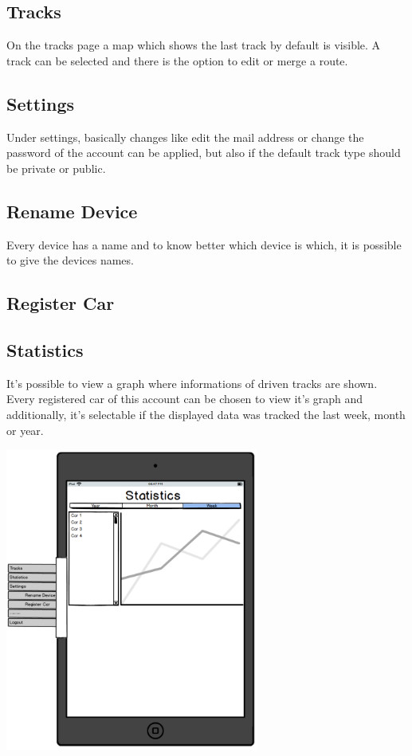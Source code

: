 \subsection{Tracks}
On the tracks page a map which shows the last track by default is visible. A track can be selected and there is the option to edit or merge a route.
\subsection{Settings}
Under settings, basically changes like edit the mail address or change the password of the account can be applied, but also if the default track type should be private or public.
\subsection{Rename Device}
Every device has a name and to know better which device is which, it is possible to give the devices names.
\subsection{Register Car}

\subsection{Statistics}
It’s possible to view a graph where informations of driven tracks are shown. Every registered car of this account can be chosen to view it’s graph and additionally, it’s selectable if the displayed data was tracked the last week, month or year.
\begin{center}
\includegraphics[width=0.625\textwidth]{bilder/Tablet}
\end{center}
